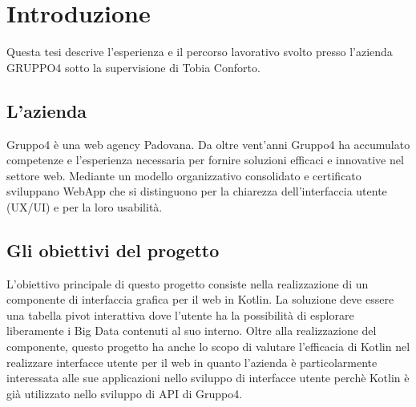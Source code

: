 
\chapter{Introduzione}
\label{cap:introduzione}

Questa tesi descrive l'esperienza e il percorso lavorativo svolto presso l'azienda GRUPPO4 sotto la supervisione di Tobia Conforto.





\section{L'azienda}
Gruppo4 è una web agency Padovana. Da oltre vent'anni Gruppo4 ha accumulato competenze e l'esperienza necessaria per fornire soluzioni efficaci e innovative nel settore web. Mediante un modello organizzativo consolidato e certificato sviluppano WebApp che si distinguono per la chiarezza dell'interfaccia utente (UX/UI) e per la loro usabilità.

\section{Gli obiettivi del progetto}
L'obiettivo principale di questo progetto consiste nella realizzazione di un componente di interfaccia grafica per il web in Kotlin. La soluzione deve essere una tabella pivot interattiva dove l'utente ha la possibilità di esplorare liberamente i Big Data contenuti al suo interno. Oltre alla realizzazione del componente, questo progetto ha anche lo scopo di valutare l'efficacia di Kotlin nel realizzare interfacce utente per il web in quanto l'azienda è particolarmente interessata alle sue applicazioni nello sviluppo di interfacce utente perchè Kotlin è già utilizzato nello sviluppo di API di Gruppo4.

